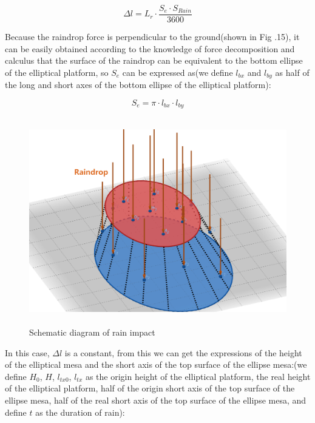\documentclass[13pt]{ctexart}
\begin{document}
	\begin{equation}
	{\Delta}l = L_r {\cdot} \frac{S_e {\cdot} S_{Rain}}{3600}
	\label{eq_pagerank}
	\end{equation}
	
	Because the raindrop force is perpendicular to the ground(shown in Fig .15), it can be easily obtained according to the knowledge of force decomposition and calculus that the surface of the raindrop can be equivalent to the bottom ellipse of the elliptical platform, so $S_e$ can be expressed as(we define $l_{bx}$ and $l_{by}$ as half of the long and short axes of the bottom ellipse of the elliptical platform):
	
	\begin{equation}
	S_e = \pi \cdot l_{bx} \cdot l_{by}
	\label{eq_pagerank}
	\end{equation}
	
	
	\begin {figure}[h]
	\centering %
	\includegraphics[width=12cm,height=9cm]{raindrop.png}
	\caption{Schematic diagram of rain impact} %
	\label{spread_rate}
	\end {figure}
	
	In this case, ${\Delta}l$ is a constant, from this we can get the expressions of the height of the elliptical mesa and the short axis of the top surface of the ellipse mesa:(we define $H_0$, $H$, $l_{tx0}$, $l_{tx}$ as the origin height of the elliptical platform, the real height of the elliptical platform, half of the origin short axis of the top surface of the ellipse mesa, half of the real short axis of the top surface of the ellipse mesa, and define $t$ as the duration of rain):
	
\end{document}
